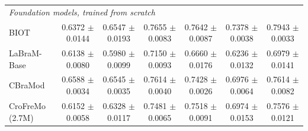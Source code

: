 \begin{table}[t]
{\begin{tabular}{lcccccc}
\midrule
\multicolumn{7}{l}{\textit{Foundation models, trained from scratch}} \\
BIOT & 0.6372 $\pm$ 0.0144 & 0.6547 $\pm$ 0.0193 & 0.7655 $\pm$ 0.0083 & 0.7642 $\pm$ 0.0087 & 0.7378 $\pm$ 0.0038 & 0.7943 $\pm$ 0.0033 \\
LaBraM-Base & 0.6138 $\pm$ 0.0080 & 0.5980 $\pm$ 0.0099 & 0.7150 $\pm$ 0.0093 & 0.6660 $\pm$ 0.0176 & 0.6236 $\pm$ 0.0132 & 0.6979 $\pm$ 0.0141 \\
CBraMod & 0.6588 $\pm$ 0.0034 & 0.6545 $\pm$ 0.0035 & 0.7614 $\pm$ 0.0040 & 0.7428 $\pm$ 0.0026 & 0.6976 $\pm$ 0.0064 & 0.7614 $\pm$ 0.0082 \\
\midrule
CroFreMo (2.7M) & 0.6152 $\pm$ 0.0058 & 0.6328 $\pm$ 0.0117 & 0.7481 $\pm$ 0.0065 & 0.7518 $\pm$ 0.0091 & 0.6974 $\pm$ 0.0153 & 0.7576 $\pm$ 0.0121 \\
\bottomrule
\end{tabular}}
\end{table}